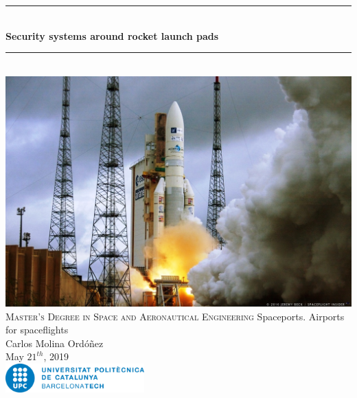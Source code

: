 
\begin{titlepage}

\newcommand{\HRule}{\rule{\linewidth}{0.5mm}} %

\center %


\HRule \\[0.2cm]
{ \Large \bfseries
Security systems around rocket launch pads\\
}
\HRule \\[1.1cm]

\includegraphics[width=\textwidth]{img/Ariane-5-launch.jpg}
\\[0.8cm]

\textsc{\large Master's Degree in Space and Aeronautical Engineering}
\large Spaceports. Airports for spaceflights\\[0.8cm]

{ \normalsize Carlos Molina Ordóñez}\\

{\normalsize May $21^{th}$, 2019}\\[1cm] %

\includegraphics[width=0.4\textwidth]{img/UPC_logo.jpg}\\[0.4cm]


\vfill %

\end{titlepage}
